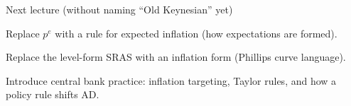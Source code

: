 \documentclass[aspectratio=169,xcolor=dvipsnames]{beamer}
\let\tempone\itemize
\let\temptwo\enditemize
\renewenvironment{itemize}{\tempone\addtolength{\itemsep}{\fill}}{\temptwo}
\begin{document}
\begin{frame}{Next lecture (without naming ``Old Keynesian'' yet)}
\begin{itemize}
\item Replace $p^e$ with a rule for expected inflation (how expectations are formed).
\item Replace the level-form SRAS with an inflation form (Phillips curve language).
\item Introduce central bank practice: inflation targeting, Taylor rules, and how a policy rule shifts AD.
\end{itemize}
\end{frame}
\end{document}
